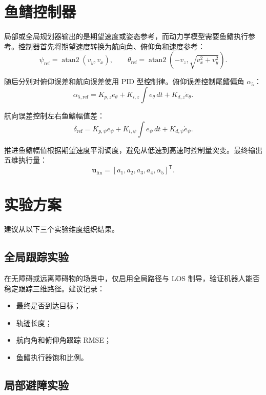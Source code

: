 \documentclass[UTF8,a4paper,12pt]{ctexart}
\begin{document}
\section{鱼鳍控制器}

局部或全局规划器输出的是期望速度或姿态参考，而动力学模型需要鱼鳍执行参考。控制器首先将期望速度转换为航向角、俯仰角和速度参考：
\begin{equation}
\psi_{\mathrm{ref}} = \operatorname{atan2}(v_y, v_x), \qquad
\theta_{\mathrm{ref}} = \operatorname{atan2}(-v_z, \sqrt{v_x^2+v_y^2}).
\end{equation}

随后分别对俯仰误差和航向误差使用 PID 型控制律。俯仰误差控制尾鳍偏角 $\alpha_5$：
\begin{equation}
\alpha_{5,\mathrm{ref}} =
K_{p,z}e_\theta + K_{i,z}\int e_\theta\,dt + K_{d,z}\dot{e}_\theta.
\end{equation}

航向误差控制左右鱼鳍幅值差：
\begin{equation}
\delta_{\mathrm{ref}} =
K_{p,\psi}e_\psi + K_{i,\psi}\int e_\psi\,dt + K_{d,\psi}\dot{e}_\psi.
\end{equation}

推进鱼鳍幅值根据期望速度平滑调度，避免从低速到高速时控制量突变。最终输出五维执行量：
\begin{equation}
\bm{u}_{\mathrm{fin}} =
[a_1, a_2, a_3, a_4, \alpha_5]^\mathsf{T}.
\end{equation}

\section{实验方案}

建议从以下三个实验维度组织结果。

\subsection{全局跟踪实验}

在无障碍或远离障碍物的场景中，仅启用全局路径与 LOS 制导，验证机器人能否稳定跟踪三维路径。建议记录：
\begin{itemize}
  \item 最终是否到达目标；
  \item 轨迹长度；
  \item 航向角和俯仰角跟踪 RMSE；
  \item 鱼鳍执行器饱和比例。
\end{itemize}

\subsection{局部避障实验}
\end{document}
